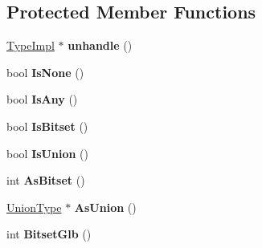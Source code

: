 \subsection*{Protected Member Functions}
\begin{DoxyCompactItemize}
\item 
\hypertarget{classv8_1_1internal_1_1_type_impl_ac9863b7c055038026dea653473d417a7}{}\hyperlink{classv8_1_1internal_1_1_type_impl}{Type\+Impl} $\ast$ {\bfseries unhandle} ()\label{classv8_1_1internal_1_1_type_impl_ac9863b7c055038026dea653473d417a7}

\item 
\hypertarget{classv8_1_1internal_1_1_type_impl_a1dcfded7a33567adff4b8531e4b450f2}{}bool {\bfseries Is\+None} ()\label{classv8_1_1internal_1_1_type_impl_a1dcfded7a33567adff4b8531e4b450f2}

\item 
\hypertarget{classv8_1_1internal_1_1_type_impl_a1b48da0a9f378d384478988b73412dbf}{}bool {\bfseries Is\+Any} ()\label{classv8_1_1internal_1_1_type_impl_a1b48da0a9f378d384478988b73412dbf}

\item 
\hypertarget{classv8_1_1internal_1_1_type_impl_a99938ff789d00ab482a4e641dfef9b22}{}bool {\bfseries Is\+Bitset} ()\label{classv8_1_1internal_1_1_type_impl_a99938ff789d00ab482a4e641dfef9b22}

\item 
\hypertarget{classv8_1_1internal_1_1_type_impl_aba944d4b222d64c662f15b41bcdf868e}{}bool {\bfseries Is\+Union} ()\label{classv8_1_1internal_1_1_type_impl_aba944d4b222d64c662f15b41bcdf868e}

\item 
\hypertarget{classv8_1_1internal_1_1_type_impl_ad10e07eb98155c994383263eab7d99e7}{}int {\bfseries As\+Bitset} ()\label{classv8_1_1internal_1_1_type_impl_ad10e07eb98155c994383263eab7d99e7}

\item 
\hypertarget{classv8_1_1internal_1_1_type_impl_a0d5e0cd9b838861ffab4354dc69a5592}{}\hyperlink{classv8_1_1internal_1_1_type_impl_1_1_union_type}{Union\+Type} $\ast$ {\bfseries As\+Union} ()\label{classv8_1_1internal_1_1_type_impl_a0d5e0cd9b838861ffab4354dc69a5592}

\item 
\hypertarget{classv8_1_1internal_1_1_type_impl_a4cb451401fd1cb59b149ff48746b0406}{}int {\bfseries Bitset\+Glb} ()\label{classv8_1_1internal_1_1_type_impl_a4cb451401fd1cb59b149ff48746b0406}


\end{DoxyCompactItemize}
